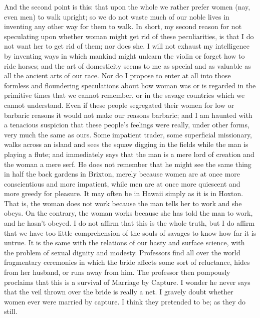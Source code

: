 \documentclass{book}
\begin{document}
And the second point is this: that upon the whole we rather prefer women (nay, even men) to walk upright; so we do not waste much of our noble lives in inventing any other way for them to walk. In short, my second reason for not speculating upon whether woman might get rid of these peculiarities, is that I do not want her to get rid of them; nor does she. I will not exhaust my intelligence by inventing ways in which mankind might unlearn the violin or forget how to ride horses; and the art of domesticity seems to me as special and as valuable as all the ancient arts of our race. Nor do I propose to enter at all into those formless and floundering speculations about how woman was or is regarded in the primitive times that we cannot remember, or in the savage countries which we cannot understand. Even if these people segregated their women for low or barbaric reasons it would not make our reasons barbaric; and I am haunted with a tenacious suspicion that these people’s feelings were really, under other forms, very much the same as ours. Some impatient trader, some superficial missionary, walks across an island and sees the squaw digging in the fields while the man is playing a flute; and immediately says that the man is a mere lord of creation and the woman a mere serf. He does not remember that he might see the same thing in half the back gardens in Brixton, merely because women are at once more conscientious and more impatient, while men are at once more quiescent and more greedy for pleasure. It may often be in Hawaii simply as it is in Hoxton. That is, the woman does not work because the man tells her to work and she obeys. On the contrary, the woman works because she has told the man to work, and he hasn’t obeyed. I do not affirm that this is the whole truth, but I do affirm that we have too little comprehension of the souls of savages to know how far it is untrue. It is the same with the relations of our hasty and surface science, with the problem of sexual dignity and modesty. Professors find all over the world fragmentary ceremonies in which the bride affects some sort of reluctance, hides from her husband, or runs away from him. The professor then pompously proclaims that this is a survival of Marriage by Capture. I wonder he never says that the veil thrown over the bride is really a net. I gravely doubt whether women ever were married by capture. I think they pretended to be; as they do still.
\end{document}
